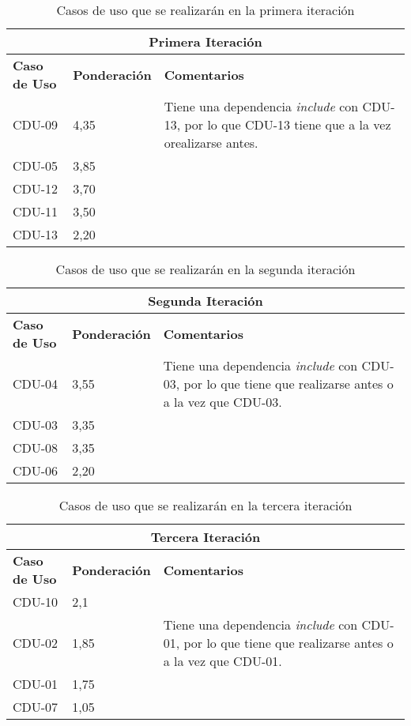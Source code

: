 \begin{table}[H]
\begin{center}
\begin{tabular}{p{2cm} p{2cm} p{8cm}}
  \multicolumn{3}{c}{\textbf{Primera Iteración} } \\ \hline \hline
  \textbf{Caso de Uso} & \textbf{Ponderación} & \textbf{Comentarios} \\ \hline \hline
  CDU-09 & 4,35 & Tiene una dependencia \textit{include} con CDU-13, por lo que CDU-13 tiene que a la vez orealizarse antes. \\ \hline
  CDU-05 & 3,85 & \\ \hline
  CDU-12 & 3,70 & \\ \hline
  CDU-11 & 3,50 & \\ \hline
  CDU-13 & 2,20 & \\ \hline
\end{tabular}
\caption{Casos de uso que se realizarán en la primera iteración}
\label{tab:iteracion1}
\end{center}
\end{table}

\begin{table}[H]
\begin{center}
\begin{tabular}{p{2cm} p{2cm} p{8cm}}
  \multicolumn{3}{c}{\textbf{Segunda Iteración} } \\ \hline \hline
  \textbf{Caso de Uso} & \textbf{Ponderación} & \textbf{Comentarios} \\ \hline \hline
  CDU-04 & 3,55 & Tiene una dependencia \textit{include} con CDU-03, por lo que tiene que realizarse antes o a la vez que CDU-03. \\ \hline
  CDU-03 & 3,35 & \\ \hline
  CDU-08 & 3,35 & \\ \hline
  CDU-06 & 2,20 & \\ \hline
\end{tabular}
\caption{Casos de uso que se realizarán en la segunda iteración}
\label{tab:iteracion2}
\end{center}
\end{table}

\begin{table}[H]
\begin{center}
\begin{tabular}{p{2cm} p{2cm} p{8cm}}
  \multicolumn{3}{c}{\textbf{Tercera Iteración} } \\ \hline \hline
  \textbf{Caso de Uso} & \textbf{Ponderación} & \textbf{Comentarios} \\ \hline \hline
  CDU-10 & 2,1 & \\ \hline
  CDU-02 & 1,85 & Tiene una dependencia \textit{include} con CDU-01, por lo que tiene que realizarse antes o a la vez que CDU-01. \\ \hline
  CDU-01 & 1,75 & \\ \hline
  CDU-07 & 1,05 & \\ \hline
\end{tabular}
\caption{Casos de uso que se realizarán en la tercera iteración}
\label{tab:iteracion3}
\end{center}
\end{table}
